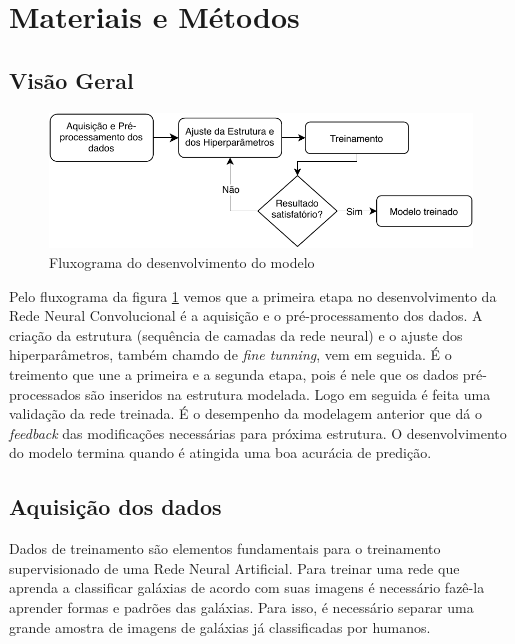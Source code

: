 \section*{Materiais e Métodos}

\subsection*{Visão Geral}

\begin{figure}[h!]
    \centering
    \includegraphics[width=\textwidth]{figures/dl_diagram.pdf}
    \caption{Fluxograma do desenvolvimento do modelo}
    \label{fig:fluxogram}
\end{figure}

Pelo fluxograma da figura \ref{fig:fluxogram} vemos que a primeira etapa no desenvolvimento da Rede Neural Convolucional é a aquisição e o pré-processamento dos dados. A criação da estrutura (sequência de camadas da rede neural) e o ajuste dos hiperparâmetros, também chamdo de \emph{fine tunning}, vem em seguida. É o treimento que une a primeira e a segunda etapa, pois é nele que os dados pré-processados são inseridos na estrutura modelada. Logo em seguida é feita uma validação da rede treinada. É o desempenho da modelagem anterior que dá o \emph{feedback} das modificações necessárias para próxima estrutura. O desenvolvimento do modelo termina quando é atingida uma boa acurácia de predição.

\subsection*{Aquisição dos dados}

Dados de treinamento são elementos fundamentais para o treinamento supervisionado de uma Rede Neural Artificial. Para treinar uma rede que aprenda a classificar galáxias de acordo com suas imagens é necessário fazê-la aprender formas e padrões das galáxias. Para isso, é necessário separar uma grande amostra de imagens de galáxias já classificadas por humanos.

